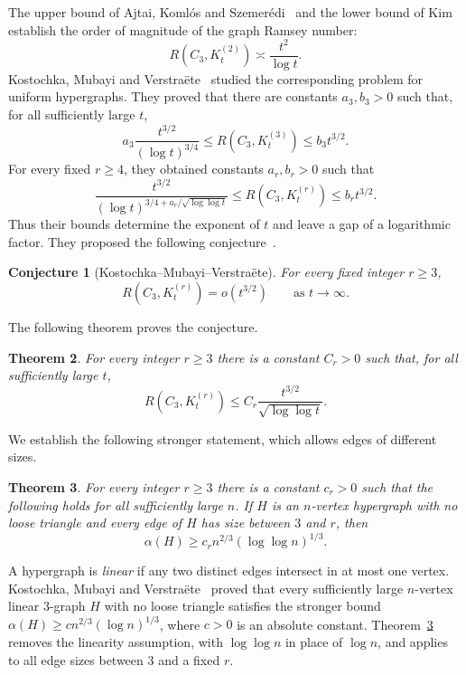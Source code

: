 \documentclass[11pt]{article}
\numberwithin{equation}{section}
\newtheorem{theorem}{Theorem}[section]
\newtheorem{conjecture}[theorem]{Conjecture}
\theoremstyle{remark}
\begin{document}
The upper bound of Ajtai, Koml\'os and Szemer\'edi~\cite{AKS} and the lower bound of Kim~\cite{Kim} establish the order of magnitude of the graph Ramsey number:
\[
 R(C_3,K_t^{(2)})\asymp\frac{t^2}{\log t}.
\]
Kostochka, Mubayi and Verstra\"ete~\cite[Theorem 1.1]{KMV} studied the corresponding problem for uniform hypergraphs. They proved that there are constants $a_3,b_3>0$ such that, for all sufficiently large $t$,
\[
 a_3\frac{t^{3/2}}{(\log t)^{3/4}}
 \le R(C_3,K_t^{(3)})\le b_3t^{3/2}.
\]
For every fixed $r\ge4$, they obtained constants $a_r,b_r>0$ such that
\[
 \frac{t^{3/2}}{(\log t)^{3/4+a_r/\sqrt{\log\log t}}}
 \le R(C_3,K_t^{(r)})\le b_rt^{3/2}.
\]
Thus their bounds determine the exponent of $t$ and leave a gap of a logarithmic factor. They proposed the following conjecture~\cite[Conjecture 1.1]{KMV}.

\begin{conjecture}[Kostochka--Mubayi--Verstra\"ete]
For every fixed integer $r\ge3$,
\[
 R(C_3,K_t^{(r)})=o(t^{3/2})\qquad\text{as }t\to\infty.
\]
\end{conjecture}

The following theorem proves the conjecture.

\begin{theorem}\label{thm:Ramsey}
For every integer $r\ge3$ there is a constant $C_r>0$ such that, for all sufficiently large $t$,
\[
 R(C_3,K_t^{(r)})\le C_r\frac{t^{3/2}}{\sqrt{\log\log t}}.
\]
\end{theorem}

We establish the following stronger statement, which allows edges of different sizes.

\begin{theorem}\label{thm:main}
For every integer $r\ge3$ there is a constant $c_r>0$ such that the following holds for all sufficiently large $n$. If $H$ is an $n$-vertex hypergraph with no loose triangle and every edge of $H$ has size between $3$ and $r$, then
\[
 \alpha(H)\ge c_r n^{2/3}(\log\log n)^{1/3}.
\]
\end{theorem}

A hypergraph is \emph{linear} if any two distinct edges intersect in at most one vertex. Kostochka, Mubayi and Verstra\"ete~\cite[Theorem 1.2]{KMV} proved that every sufficiently large $n$-vertex linear $3$-graph $H$ with no loose triangle satisfies the stronger bound $\alpha(H)\ge c n^{2/3}(\log n)^{1/3}$, where $c>0$ is an absolute constant. Theorem~\ref{thm:main} removes the linearity assumption, with $\log\log n$ in place of $\log n$, and applies to all edge sizes between $3$ and a fixed $r$.
\end{document}
